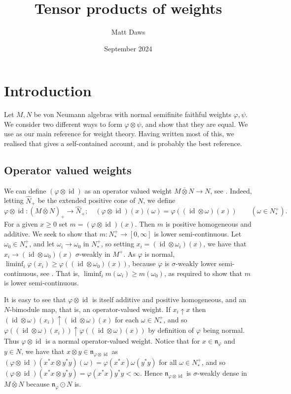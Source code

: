 \documentclass[a4paper,11pt]{article}
\theoremstyle{plain}
\theoremstyle{remark}
\newcommand{\mf}[1]{\mathfrak{#1}}
\newcommand{\id}{\operatorname{id}}
\newcommand{\vnten}{\bar\otimes}
\newcommand{\hh}{\widehat}
\begin{document}
\title{Tensor products of weights}
\author{Matt Daws}
\date{September 2024}
\maketitle

\section{Introduction}

Let $M,N$ be von Neumann algebras with normal semifinite faithful weights $\varphi,\psi$.  We consider two different ways to form $\varphi\otimes\psi$, and show that they are equal.  We use \cite{TakesakiII} as our main reference for weight theory.  Having written most of this, we realised that \cite[Section~8]{Stratila_ModTheoryBook} gives a self-contained account, and is probably the best reference.


\subsection{Operator valued weights}\label{sec:opvalweight}

We can define $(\varphi\otimes\id)$ as an operator valued weight $M\vnten N \to N$, see \cite[Chapter~IX, Section~4]{TakesakiII}.  Indeed, letting $\hh N_+$ be the extended positive cone of $N$, we define
\[ \varphi\otimes\id \colon (M\vnten N)_+ \to \hh N_+; \quad
(\varphi\otimes\id)(x)(\omega) = \varphi((\id\otimes\omega)(x)) \qquad (\omega \in N_*^+). \]
For a given $x\geq 0$ set $m = (\varphi\otimes\id)(x)$.  Then $m$ is positive homogeneous and additive.  We seek to show that $m \colon N_*^+ \to [0,\infty]$ is lower semi-continuous.  Let $\omega_0 \in N_*^+$, and let $\omega_i \to \omega_0$ in $N_*^+$, so setting $x_i = (\id\otimes\omega_i)(x)$, we have that $x_i \to (\id\otimes\omega_0)(x)$ $\sigma$-weakly in $M^+$.  As $\varphi$ is normal, $\liminf_i \varphi(x_i) \geq \varphi((\id\otimes\omega_0)(x))$, because $\varphi$ is $\sigma$-weakly lower semi-continuous, see \cite[Theorem~VII.1.11]{TakesakiII}.  That is, $\liminf_i m(\omega_i) \geq m(\omega_0)$, as required to show that $m$ is lower semi-continuous.

It is easy to see that $\varphi\otimes\id$ is itself additive and positive homogeneous, and an $N$-bimodule map, that is, an operator-valued weight.  If $x_i \uparrow x$ then $(\id\otimes\omega)(x_i) \uparrow (\id\otimes\omega)(x)$ for each $\omega\in N_*^+$, and so $\varphi((\id\otimes\omega)(x_i)) \uparrow \varphi((\id\otimes\omega)(x))$ by definition of $\varphi$ being normal.  Thus $\varphi\otimes\id$ is a normal operator-valued weight.  Notice that for $x\in\mf n_\varphi$ and $y\in N$, we have that $x \otimes y \in \mf n_{\varphi\otimes\id}$ as $(\varphi\otimes\id)(x^*x\otimes y^*y)(\omega) = \varphi(x^*x) \omega(y^*y)$ for all $\omega\in N_*^+$, and so $(\varphi\otimes\id)(x^*x\otimes y^*y) = \varphi(x^*x) y^*y < \infty$.  Hence $\mf n_{\varphi\otimes\id}$ is $\sigma$-weakly dense in $M\vnten N$ because $\mf n_\varphi \odot N$ is.
\end{document}
